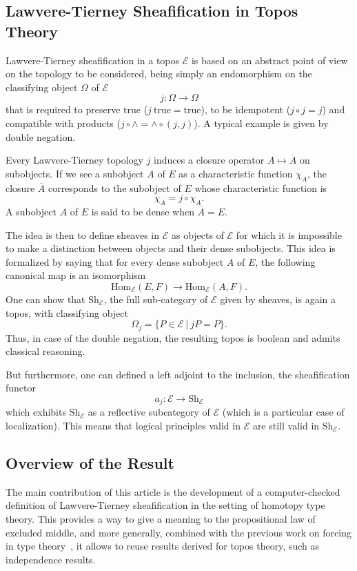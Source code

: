 \documentclass[conference]{IEEEtran}
\newcommand \True {\mathrm{true}}
\newcommand \closure[1] {\overline{#1}}
\newcommand \Char[1] {\chi_{#1}}%
\newcommand \E {\mathcal{E}}
\newcommand \Hom[1] {\mathrm{Hom}_{#1}}
\newcommand \Sh[1] {\mathrm{Sh}_{#1}}
\begin{document}
\subsection{Lawvere-Tierney Sheafification in Topos Theory}
\label{sec:lawv-tiern-sheaf}

Lawvere-Tierney sheafification in a topos $\E$ is based on an abstract
point of view on the topology to be considered, being simply an
endomorphism on the classifying object $\Omega$ of $\E$  
%
$$
j : \Omega \rightarrow \Omega
$$
%
that is required to preserve $\True$ ($j \ \True = \True$), to be
idempotent ($j \circ j = j$) and compatible with products ($j \circ
\wedge = \wedge \circ (j, j)$).
%
A typical example is given by double negation.

Every Lawvere-Tierney topology $j$ induces a closure operator
$A \mapsto \closure{A}$ on subobjects. If we see a subobject $A$ of $E$
as a characteristic function $\Char{A}$, the closure $\closure{A}$
corresponds to the subobject of $E$ whose characteristic function is 
%
$$
\Char{\closure{A}} = j \circ \Char{A}.
$$
%
A subobject $A$ of $E$ is said to
be dense when $\closure{A} = E$.

The idea is then to define sheaves in $\E$ as objects of $\E$ for
which it is impossible to make a distinction between objects and their
dense subobjects. This idea is formalized by saying that for every
dense subobject $A$ of $E$, the following canonical map is an
isomorphism
%
\begin{equation}\label{equ:sheaf_def}
\Hom{\E}(E,F) \rightarrow \Hom{\E}(A,F).
\end{equation}
%
One can show that $\Sh{\E}$, the full sub-category of $\E$ given by
sheaves, is again a topos, with classifying object
%
$$
\Omega_j = \{ P \in \E \ | \ j P  = P \}.
$$
%
Thus, in case of the double negation, the resulting topos is boolean  
and admits classical reasoning.

But furthermore, one can defined a left adjoint to the inclusion, the
sheafification functor
%
$$
a_j : \E \rightarrow \Sh{\E}
$$
which exhibits $\Sh{\E}$ as a reflective
subcategory of $\E$ (which is a particular case of localization). This
means that logical principles valid in $\E$ are still valid in
$\Sh{\E}$.


\subsection{Overview of the Result}

The main contribution of this article is the development of a
computer-checked definition of Lawvere-Tierney sheafification in the
setting of homotopy type theory.
%
This provides a way to give a meaning to the propositional law of
excluded middle, and more generally, combined with the previous work on
forcing in type theory~\cite{jaber2012extending}, it allows to reuse
results derived for topos theory, such as independence results.
\end{document}

